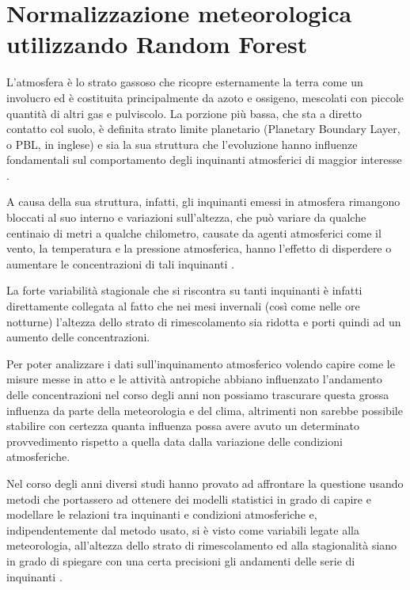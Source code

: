 \documentclass[a4paper]{report}
\begin{document}

\chapter{Normalizzazione meteorologica utilizzando Random Forest}
L'atmosfera è lo strato gassoso che ricopre esternamente la terra come un involucro ed è costituita principalmente da azoto e ossigeno, mescolati con piccole quantità di altri gas e pulviscolo. La porzione più bassa, che sta a diretto contatto col suolo, è definita strato limite planetario (Planetary Boundary Layer, o PBL, in inglese) e sia la sua struttura che l'evoluzione hanno influenze fondamentali sul comportamento degli inquinanti atmosferici di maggior interesse \cite{dina2009concentrazione}.  

A causa della sua struttura, infatti, gli inquinanti emessi in atmosfera rimangono bloccati al suo interno e variazioni sull'altezza, che può variare da qualche centinaio di metri a qualche chilometro, causate da agenti atmosferici come il vento, la temperatura e la pressione atmosferica, hanno l'effetto di disperdere o aumentare le concentrazioni di tali inquinanti \cite{stull2012introduction}.  

La forte variabilità stagionale che si riscontra su tanti inquinanti è infatti direttamente collegata al fatto che nei mesi invernali (così come nelle ore notturne) l'altezza dello strato di rimescolamento sia ridotta e porti quindi ad un aumento delle concentrazioni.  

Per poter analizzare i dati sull'inquinamento atmosferico volendo capire come le misure messe in atto e le attività antropiche abbiano influenzato l'andamento delle concentrazioni nel corso degli anni non possiamo trascurare questa grossa influenza da parte della meteorologia e del clima, altrimenti non sarebbe possibile stabilire con certezza quanta influenza possa avere avuto un determinato provvedimento rispetto a quella data dalla variazione delle condizioni atmosferiche.  

Nel corso degli anni diversi studi hanno provato ad affrontare la questione usando metodi che portassero ad ottenere dei modelli statistici in grado di capire e modellare le relazioni tra inquinanti e condizioni atmosferiche e, indipendentemente dal metodo usato, si è visto come variabili legate alla meteorologia, all'altezza dello strato di rimescolamento ed alla stagionalità siano in grado di spiegare con una certa precisioni gli andamenti delle serie di inquinanti \cite{aldrin2005generalised, elminir2005depndence, eagleman1991air, seagal1982numerical, cattani2014analisi, barmpadimos2011influence}.  
\end{document}
